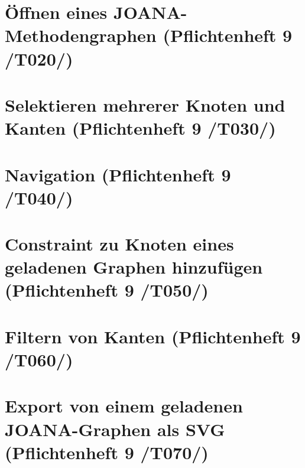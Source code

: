 \section{Öffnen eines JOANA-Methodengraphen (Pflichtenheft 9 /T020/)}

\section{Selektieren mehrerer Knoten und Kanten (Pflichtenheft 9 /T030/)}

\section{Navigation (Pflichtenheft 9 /T040/)}

\section{Constraint zu Knoten eines geladenen Graphen hinzufügen (Pflichtenheft 9 /T050/)}

\section{Filtern von Kanten (Pflichtenheft 9 /T060/)}

\section{Export von einem geladenen JOANA-Graphen als SVG (Pflichtenheft 9 /T070/)}